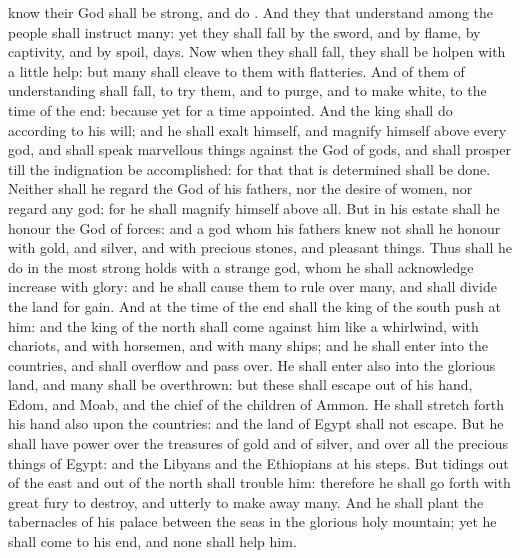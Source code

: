 {know their
God shall be
strong, and
do
{}.
And they that
understand among the
people shall
instruct
many: yet they shall
fall by the
sword, and by
flame, by
captivity, and by
spoil,
{}
days.
Now when they shall
fall, they shall be
holpen with a
little
help: but
many shall
cleave to them with
flatteries.
And
{} of them of
understanding shall
fall, to
try them, and to
purge, and to make
{}
white,
{} to the
time of the
end: because
{} yet for a time
appointed.
And the
king shall
do according to his
will; and he shall
exalt himself, and
magnify himself above every
god, and shall
speak marvellous
things against the
God of
gods, and shall
prosper till the
indignation be
accomplished: for that that is
determined shall be
done.
Neither shall he
regard the
God of his
fathers, nor the
desire of
women, nor
regard any
god: for he shall
magnify himself above all.
But in his
estate shall he
honour the
God of
forces: and a
god whom his
fathers
knew not shall he
honour with
gold, and
silver, and with
precious
stones, and pleasant
things.
Thus shall he
do in the most
strong
holds with a
strange
god, whom he shall
acknowledge
{}
increase with
glory: and he shall cause them to
rule over
many, and shall
divide the
land for
gain.
And at the
time of the
end shall the
king of the
south
push at him: and the
king of the
north shall come against him like a
whirlwind, with
chariots, and with
horsemen, and with
many
ships; and he shall
enter into the
countries, and shall
overflow and pass
over.
He shall
enter also into the
glorious
land, and
many
{} shall be
overthrown: but these shall
escape out of his
hand,
{}
Edom, and
Moab, and the
chief of the
children of
Ammon.
He shall stretch
forth his
hand also upon the
countries: and the
land of
Egypt shall not
escape.
But he shall have
power over the
treasures of
gold and of
silver, and over all the
precious things of
Egypt: and the
Libyans and the
Ethiopians
{} at his
steps.
But
tidings out of the
east and out of the
north shall
trouble him: therefore he shall go
forth with
great
fury to
destroy, and utterly to make
away
many.
And he shall
plant the
tabernacles of his
palace between the
seas in the
glorious
holy
mountain; yet he shall
come to his
end, and none shall
help him.

}
